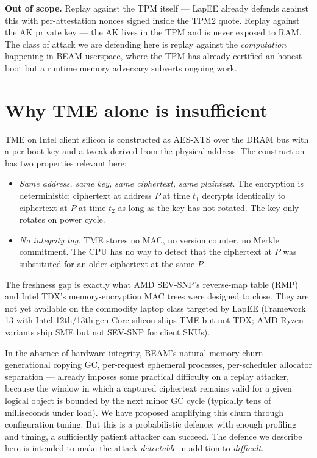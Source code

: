 \documentclass[10pt,a4paper]{article}
\begin{document}
\textbf{Out of scope.} Replay against the TPM itself --- LapEE already
defends against this with per-attestation nonces signed inside the TPM2
quote. Replay against the AK private key --- the AK lives in the TPM
and is never exposed to RAM. The class of attack we are defending here
is replay against the \emph{computation} happening in BEAM userspace,
where the TPM has already certified an honest boot but a runtime memory
adversary subverts ongoing work.

\section{Why TME alone is insufficient}

TME on Intel client silicon is constructed as AES-XTS over the DRAM bus
with a per-boot key and a tweak derived from the physical address. The
construction has two properties relevant here:

\begin{itemize}[label=---]
\item \emph{Same address, same key, same ciphertext, same plaintext.} The
encryption is deterministic; ciphertext at address $P$ at time $t_1$
decrypts identically to ciphertext at $P$ at time $t_2$ as long as the
key has not rotated. The key only rotates on power cycle.
\item \emph{No integrity tag.} TME stores no MAC, no version counter,
no Merkle commitment. The CPU has no way to detect that the ciphertext
at $P$ was substituted for an older ciphertext at the same $P$.
\end{itemize}

The freshness gap is exactly what AMD SEV-SNP's reverse-map table (RMP)
and Intel TDX's memory-encryption MAC trees were designed to close. They
are not yet available on the commodity laptop class targeted by LapEE
(Framework 13 with Intel 12th/13th-gen Core silicon ships TME but not
TDX; AMD Ryzen variants ship SME but not SEV-SNP for client SKUs).

In the absence of hardware integrity, BEAM's natural memory churn ---
generational copying GC, per-request ephemeral processes, per-scheduler
allocator separation --- already imposes some practical difficulty on a
replay attacker, because the window in which a captured ciphertext
remains valid for a given logical object is bounded by the next minor GC
cycle (typically tens of milliseconds under load). We have proposed
amplifying this churn through configuration tuning. But this is a
probabilistic defence: with enough profiling and timing, a sufficiently
patient attacker can succeed. The defence we describe here is intended
to make the attack \emph{detectable} in addition to \emph{difficult}.
\end{document}

